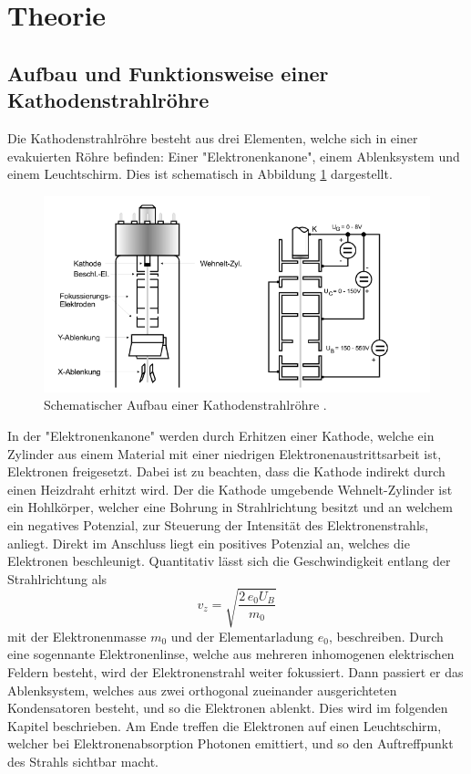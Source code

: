 \section{Theorie}
\label{sec:Theorie}

\subsection{Aufbau und Funktionsweise einer Kathodenstrahlröhre}
\label{sec:kröhre}
Die Kathodenstrahlröhre besteht aus drei Elementen, welche sich in einer evakuierten Röhre befinden: Einer "Elektronenkanone", einem Ablenksystem und einem Leuchtschirm.
Dies ist schematisch in Abbildung \ref{fig:kröhre} dargestellt.
\begin{figure}
  \centering
  \includegraphics{images/kroehre.png}
  \caption{Schematischer Aufbau einer Kathodenstrahlröhre \cite{501}.}
  \label{fig:kröhre}
\end{figure}
In der "Elektronenkanone" werden durch Erhitzen einer Kathode, welche ein Zylinder aus einem Material mit einer niedrigen Elektronenaustrittsarbeit ist, Elektronen
freigesetzt. Dabei ist zu beachten, dass die Kathode indirekt durch einen Heizdraht erhitzt wird. Der die Kathode umgebende Wehnelt-Zylinder ist ein Hohlkörper, welcher
eine Bohrung in Strahlrichtung besitzt und an welchem ein negatives Potenzial, zur Steuerung der Intensität des Elektronenstrahls, anliegt.
Direkt im Anschluss liegt ein positives Potenzial an, welches die Elektronen beschleunigt. Quantitativ lässt sich die Geschwindigkeit entlang der Strahlrichtung als
\begin{equation}
  v_z = \sqrt{\frac{2 \, e_0 U_B}{m_0}}
  \label{eqn:vz}
\end{equation}
mit der Elektronenmasse $m_0$ und der Elementarladung $e_0$, beschreiben.
Durch eine sogennante Elektronenlinse, welche aus mehreren inhomogenen elektrischen Feldern besteht, wird der Elektronenstrahl weiter fokussiert.
Dann passiert er das Ablenksystem, welches aus zwei orthogonal zueinander ausgerichteten Kondensatoren besteht, und so die Elektronen ablenkt. Dies wird
im folgenden Kapitel beschrieben. Am Ende treffen die Elektronen auf einen Leuchtschirm, welcher bei Elektronenabsorption Photonen emittiert, und so den
Auftreffpunkt des Strahls sichtbar macht.

